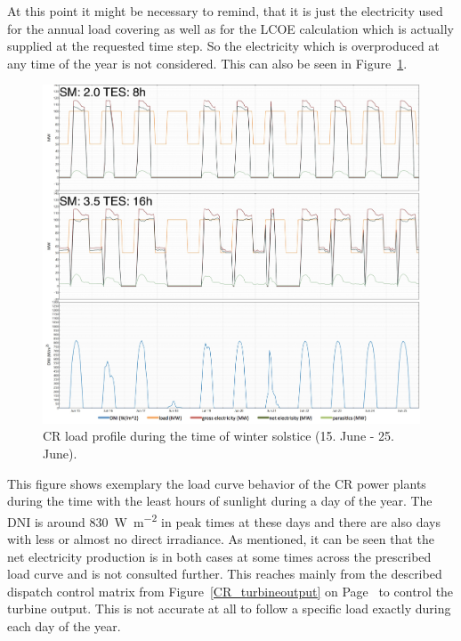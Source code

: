 At this point it might be necessary to remind, that it is just the electricity used for the annual load covering as well as for the LCOE calculation which is actually supplied at the requested time step. So the electricity which is overproduced at any time of the year is not considered. This can also be seen in Figure~\ref{CR_winter_load}. 
\begin{figure}[htbp]  
\centering
\includegraphics[width=1\linewidth]{FIG/CR_winter_load}
\caption[CR load profile during the time of winter solstice (15. June - 25. June).]{CR load profile during the time of winter solstice (15. June - 25. June).}\label{CR_winter_load}
\end{figure}
This figure shows exemplary the load curve behavior of the CR power plants during the time with the least hours of sunlight during a day of the year. The DNI is around \SI{830}{\watt\per\square\metre} in peak times at these days and there are also days with less or almost no direct irradiance. As mentioned, it can be seen that the net electricity production is in both cases at some times across the prescribed load curve and is not consulted further. This reaches mainly from the described dispatch control matrix from Figure~\ref{CR_turbineoutput} on Page~\pageref{CR_turbineoutput} to control the turbine output. This is not accurate at all to follow a specific load exactly during each day of the year. 

